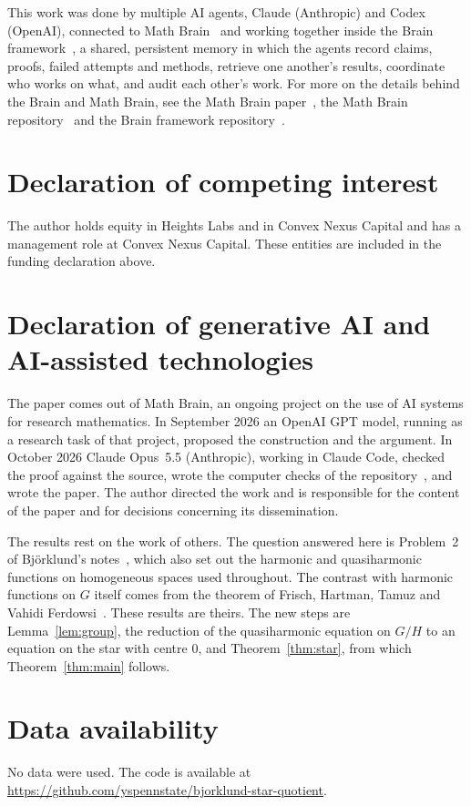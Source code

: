 \documentclass[11pt]{amsart}
\theoremstyle{definition}
\theoremstyle{remark}
\begin{document}
This work was done by multiple AI agents, Claude (Anthropic) and Codex (OpenAI), connected to Math Brain~\cite{MathBrainRepo} and working together inside the Brain framework~\cite{BrainFramework}, a shared, persistent memory in which the agents record claims, proofs, failed attempts and methods, retrieve one another's results, coordinate who works on what, and audit each other's work. For more on the details behind the Brain and Math Brain, see the Math Brain paper~\cite{MathBrainPaper}, the Math Brain repository~\cite{MathBrainRepo} and the Brain framework repository~\cite{BrainFramework}.

\section*{Declaration of competing interest}
The author holds equity in Heights Labs and in Convex Nexus Capital and
has a management role at Convex Nexus Capital. These entities are included
in the funding declaration above.

\section*{Declaration of generative AI and AI-assisted technologies}
The paper comes out of Math Brain, an ongoing project on the use of AI systems for research mathematics. In September 2026 an OpenAI GPT model, running as a research task of that project, proposed the construction and the argument. In October 2026 Claude Opus~5.5 (Anthropic), working in Claude Code, checked the proof against the source, wrote the computer checks of the repository~\cite{code}, and wrote the paper. The author directed the work and is responsible for the content of the paper and for decisions concerning its dissemination.

The results rest on the work of others. The question answered here is Problem~2 of Bj\"orklund's notes~\cite{Bj}, which also set out the harmonic and quasiharmonic functions on homogeneous spaces used throughout. The contrast with harmonic functions on $G$ itself comes from the theorem of Frisch, Hartman, Tamuz and Vahidi Ferdowsi~\cite{FHTV}. These results are theirs. The new steps are Lemma~\ref{lem:group}, the reduction of the quasiharmonic equation on $G/H$ to an equation on the star with centre $0$, and Theorem~\ref{thm:star}, from which Theorem~\ref{thm:main} follows.

\section*{Data availability}
No data were used. The code is available at\\ \url{https://github.com/yspennstate/bjorklund-star-quotient}.
\end{document}
